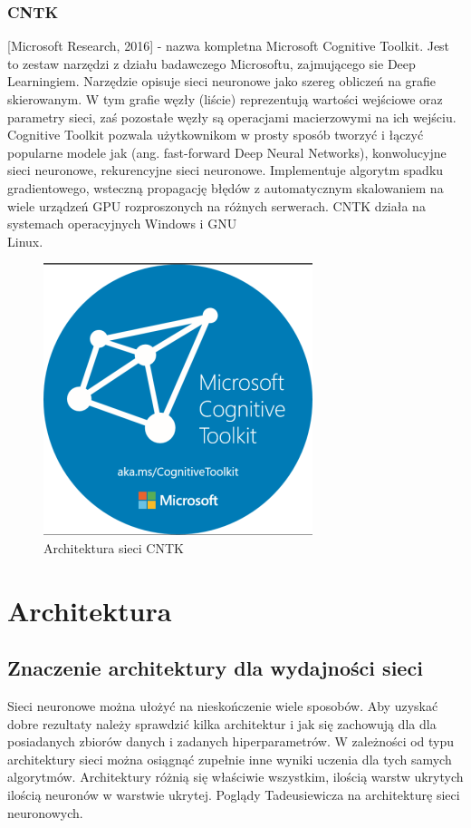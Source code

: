 \documentclass[12pt,a4paper,twoside,titlepage,openright]{book}
\begin{document}
\subsection{CNTK}
[Microsoft Research, 2016] - nazwa kompletna Microsoft Cognitive Toolkit. Jest to zestaw narzędzi z działu badawczego Microsoftu, zajmującego sie Deep Learningiem. Narzędzie opisuje sieci neuronowe jako szereg obliczeń na grafie skierowanym. W tym grafie węzły (liście) reprezentują wartości wejściowe oraz parametry sieci, zaś pozostałe węzły są operacjami macierzowymi na ich wejściu. Cognitive Toolkit pozwala użytkownikom w prosty sposób tworzyć i łączyć popularne modele jak (ang. fast-forward Deep Neural Networks), konwolucyjne sieci neuronowe, rekurencyjne sieci neuronowe. Implementuje algorytm spadku gradientowego, wsteczną propagację błędów z automatycznym skalowaniem na wiele urządzeń GPU rozproszonych na różnych serwerach.
CNTK działa na systemach operacyjnych Windows i GNU\\Linux.
\begin{figure}[h]
	\centering
			\includegraphics[resolution=120]{CNTK.png}
		\caption{Architektura sieci CNTK}
\end{figure}


\chapter{Architektura}
\section{Znaczenie architektury dla wydajności sieci}
Sieci neuronowe można ułożyć na nieskończenie wiele sposobów. Aby uzyskać dobre rezultaty należy sprawdzić kilka architektur i jak się zachowują dla dla posiadanych zbiorów danych i zadanych hiperparametrów.
W zależności od typu architektury sieci można osiągnąć zupełnie inne wyniki uczenia dla tych samych algorytmów. 
Architektury różnią się właściwie wszystkim, ilością warstw ukrytych ilością neuronów w warstwie ukrytej. 
Poglądy Tadeusiewicza na architekturę sieci neuronowych.
\end{document}
